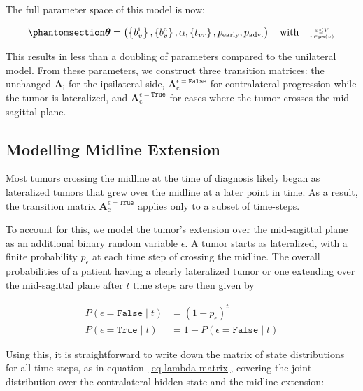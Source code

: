 \documentclass[
  sn-mathphys-num,
]{sn-jnl}
\begin{document}
The full parameter space of this model is now:

\begin{equation}\phantomsection\label{eq-bi-param-space}{
\boldsymbol{\theta} = \left( \left\{ b_v^\text{i} \right\}, \left\{ b_v^\text{c} \right\}, \alpha, \left\{ t_{vr} \right\}, p_\text{early}, p_\text{adv.} \right) \quad \text{with} \quad \genfrac{}{}{0pt}{2}{v\leq V}{r\in\operatorname{pa}(v)}
}\end{equation}

This results in less than a doubling of parameters compared to the
unilateral model. From these parameters, we construct three transition
matrices: the unchanged \(\mathbf{A}_\text{i}\) for the ipsilateral
side, \(\mathbf{A}_\text{c}^{\epsilon=\texttt{False}}\) for
contralateral progression while the tumor is lateralized, and
\(\mathbf{A}_\text{c}^{\epsilon=\texttt{True}}\) for cases where the
tumor crosses the mid-sagittal plane.

\subsection{Modelling Midline Extension}\label{sec-midline}

Most tumors crossing the midline at the time of diagnosis likely began
as lateralized tumors that grew over the midline at a later point in
time. As a result, the transition matrix
\(\mathbf{A}_\text{c}^{\epsilon=\texttt{True}}\) applies only to a
subset of time-steps.

To account for this, we model the tumor's extension over the
mid-sagittal plane as an additional binary random variable \(\epsilon\).
A tumor starts as lateralized, with a finite probability \(p_\epsilon\)
at each time step of crossing the midline. The overall probabilities of
a patient having a clearly lateralized tumor or one extending over the
mid-sagittal plane after \(t\) time steps are then given by

\[
\begin{aligned}
P(\epsilon = \texttt{False} \mid t) &= (1 - p_\epsilon)^t \\
P(\epsilon = \texttt{True} \mid t) &= 1 - P(\epsilon = \texttt{False} \mid t)
\end{aligned}
\]

Using this, it is straightforward to write down the matrix of state
distributions for all time-steps, as in equation~\ref{eq-lambda-matrix},
covering the joint distribution over the contralateral hidden state and
the midline extension:
\end{document}

